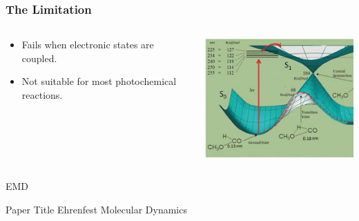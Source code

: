 \begin{frame}
    \frametitle{The Limitation}
     \begin{columns}[T]
        \begin{column}{0.5\textwidth}
            \vspace{2cm}
            \begin{itemize}
                \item Fails when electronic states are coupled.
                \item Not suitable for most photochemical reactions.
            \end{itemize}
        \end{column}
        \begin{column}{0.45\textwidth}
            \includegraphics[width=\textwidth]{images/conic_intersect.png}
        \end{column}
    \end{columns}
\end{frame}


\begin{frame}{EMD}
	\begin{block}{Paper Title}
	Ehrenfest Molecular Dynamics 
	\end{block}
\end{frame}

